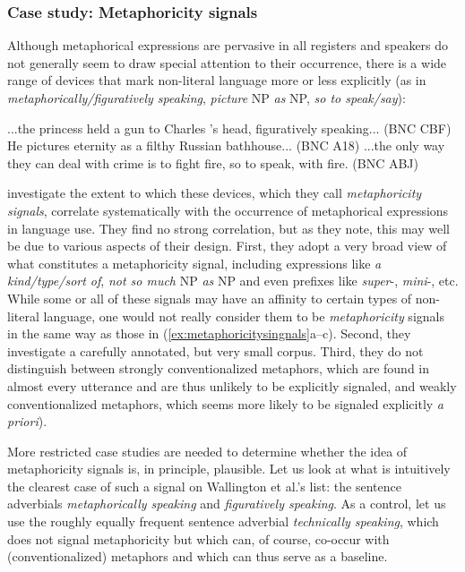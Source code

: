 \subsubsection{Case study: Metaphoricity signals}
\label{sec:metaphoricitysignals}

Although metaphorical expressions are pervasive in all registers and speakers do not generally seem to draw special attention to their occurrence, there is a wide range of devices that mark non-literal language more or less explicitly (as in \textit{metaphorically/figuratively speaking}, \textit{picture} NP \textit{as} NP, \textit{so to speak/say}):

\begin{exe}
\ex
\begin{xlist} 
\label{ex:metaphoricitysingnals}
\ex ...the princess held a gun to Charles 's head, figuratively speaking... (BNC CBF)
\ex He pictures eternity as a filthy Russian bathhouse... (BNC A18)
\ex ...the only way they can deal with crime is to fight fire, so to speak, with fire. (BNC ABJ)
\end{xlist}
\end{exe}

\citet{wallington_metaphoricity_2003} investigate the extent to which these devices, which they call \textit{metaphoricity signals}, correlate systematically with the occurrence of metaphorical expressions in language use. They find no strong correlation, but as they note, this may well be due to various aspects of their design. First, they adopt a very broad view of what constitutes a metaphoricity signal, including expressions like \textit{a kind/type/sort of}, \textit{not so much} NP \textit{as} NP and even prefixes like \textit{super}-, \textit{mini}-, etc. While some or all of these signals may have an affinity to certain types of non-literal language, one would not really consider them to be \textit{metaphoricity} signals in the same way as those in (\ref{ex:metaphoricitysingnals}a--c). Second, they investigate a carefully annotated, but very small corpus. Third, they do not distinguish between strongly conventionalized metaphors, which are found in almost every utterance and are thus unlikely to be explicitly signaled, and weakly conventionalized metaphors, which seems more likely to be signaled explicitly \textit{a priori}).

More restricted case studies are needed to determine whether the idea of metaphoricity signals is, in principle, plausible. Let us look at what is intuitively the clearest case of such a signal on Wallington et al.'s list: the sentence adverbials \textit{metaphorically speaking} and \textit{figuratively speaking}. As a control, let us use the roughly equally frequent sentence adverbial \textit{technically speaking}, which does not signal metaphoricity but which can, of course, co-occur with (conventionalized) metaphors and which can thus serve as a baseline.

